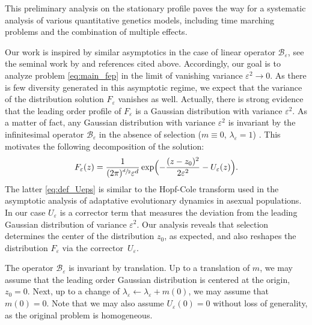 \documentclass[10pt]{amsart}
\let\mathcal\mathscr
\newcommand{\cB}{\mathcal{B}}
\theoremstyle{plain}
\theoremstyle{definition}
\let\eps\varepsilon
\begin{document}
This preliminary analysis on the stationary profile paves the way for a systematic analysis of various quantitative genetics models, including time marching problems and the combination of multiple effects.

Our work is inspired by similar asymptotics in the case of linear operator $\cB_\eps$, see the seminal work by \cite{diekmann2005} and references cited above. Accordingly, our goal is to analyze problem \eqref{eq:main_fep} in the limit of vanishing variance $\eps^2\to 0$. As there is few diversity generated in this asymptotic regime, we expect that the variance of the distribution solution $F_\eps$ vanishes as well. Actually, there is strong evidence that the leading order profile of $F_\eps$ is a Gaussian distribution with variance $\eps^2$. As a matter of fact, any Gaussian distribution with variance $\eps^2$ is invariant by the infinitesimal operator $\cB_\eps$ in the absence of selection ($m \equiv 0$, $\lambda_\eps = 1$) \cite{menormal,raoulmirrahimiinfinitesimal}. This motivates the following decomposition of the solution: \begin{equation}\label{eq:def_Ueps}
F_\eps(z) = \dfrac{1}{(2\pi)^{\sfrac d2} \eps^d} \exp\Bigl(-\dfrac{(z -z_0)^2}{2\eps^2} - U_\eps(z) \Bigr).
\end{equation}
The latter \eqref{eq:def_Ueps} is similar to the Hopf-Cole transform used in the asymptotic analysis of adaptative evolutionary dynamics in asexual populations. In our case $U_\eps$ is a corrector term that measures the deviation from the leading Gaussian distribution of variance $\eps^2$. Our analysis reveals that selection determines the center of the distribution $z_0$, as expected, and also reshapes the distribution $F_\eps$ via the corrector~$U_\eps$.

The operator $\cB_\eps$ is invariant by translation. Up to a translation of $m$, we may assume that the leading order Gaussian distribution is centered at the origin, \ie $z_0 = 0$. Next, up to a change of $\lambda_\eps \leftarrow \lambda_\eps + m(0)$, we may assume that $m(0) = 0$. Note that we may also assume $U_\eps(0) = 0$ without loss of generality, as the original problem is homogeneous.
\end{document}
